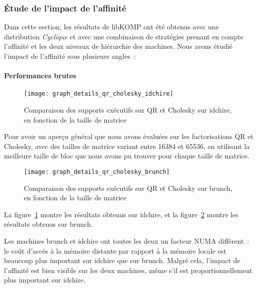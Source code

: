 \subsubsection{Étude de l'impact de l'affinité}

Dans cette section, les résultats de libKOMP ont été obtenus avec une distribution \emph{Cyclique} et avec une combinaison de stratégies prenant en compte l'affinité et les deux niveaux de hiérarchie des machines.
Nous avons étudié l'impact de l'affinité sous plusieurs angles~:

\paragraph{Performances brutes}

\begin{figure}[h!]
  \centering
  \texttt{[image: graph\_details\_qr\_cholesky\_idchire]}
  \caption{Comparaison des supports exécutifs sur QR et Cholesky sur idchire, en fonction de la taille de matrice}\label{fig:contribs:perf_eval:eval-qr-cholesky}
\end{figure}

Pour avoir un aperçu général  que nous avons évaluées sur les factorisations QR et Cholesky, avec des tailles de matrice variant entre 16384 et 65536, en utilisant la meilleure taille de bloc que nous avons pu trouver pour chaque taille de matrice.

\begin{figure}[h!]
  \centering
  \texttt{[image: graph\_details\_qr\_cholesky\_brunch]}
  \caption{Comparaison des supports exécutifs sur QR et Cholesky sur brunch, en fonction de la taille de matrice}\label{fig:contribs:perf_eval:eval-qr-cholesky-brunch}
\end{figure}

La figure~\ref{fig:contribs:perf_eval:eval-qr-cholesky} montre les résultats obtenus sur idchire, et la figure~\ref{fig:contribs:perf_eval:eval-qr-cholesky-brunch} montre les résultats obtenus sur brunch.


Les machines brunch et idchire ont toutes les deux un facteur NUMA différent~: le coût d'accès à la mémoire distante par rapport à la mémoire locale est beaucoup plus important sur idchire que sur brunch.
Malgré cela, l'impact de l'affinité est bien visible sur les deux machines, même s'il est proportionnellement plus important sur idchire.

